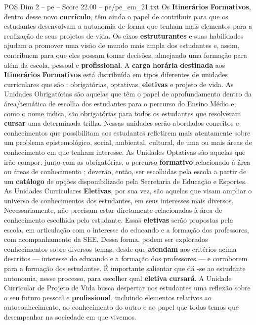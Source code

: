 \begin{textsample}{POS Dim 2 – pe – Score 22.00 – pe/pe\_em\_21.txt}
Os \textbf{Itinerários} \textbf{Formativos}, dentro desse novo \textbf{currículo}, têm ainda o papel de contribuir para que os estudantes desenvolvam a autonomia de forma que tenham mais elementos para a realização de seus projetos de vida.
Os eixos \textbf{estruturantes} e suas habilidades ajudam a promover uma visão de mundo mais ampla dos estudantes e, assim, contribuem para que eles possam tomar decisões, almejando uma formação para além da escola, pessoal e \textbf{profissional}.
A \textbf{carga} \textbf{horária} \textbf{destinada} aos \textbf{Itinerários} \textbf{Formativos} está distribuída em tipos diferentes de unidades curriculares que são : obrigatórias, optativas, \textbf{eletivas} e projeto de vida.
As Unidades Obrigatórias são aquelas que têm o papel de aprofundamento dentro da área/temática de escolha dos estudantes para o percurso do Ensino Médio e, como o nome indica, são obrigatórias para todos os estudantes que resolveram \textbf{cursar} uma determinada trilha.
Nessas unidades serão abordados conceitos e conhecimentos que possibilitam aos estudantes refletirem mais atentamente sobre um problema epistemológico, social, ambiental, cultural, de uma ou mais áreas de conhecimento em que tenham interesse.
As Unidades Optativas são aquelas que irão compor, junto com as obrigatórias, o percurso \textbf{formativo} relacionado à área ou áreas de conhecimento ; deverão, então, ser escolhidas pela escola a partir de um \textbf{catálogo} de opções disponibilizado pela Secretaria de Educação e Esportes.
As Unidades Curriculares \textbf{Eletivas}, por sua vez, são aquelas que visam ampliar o universo de conhecimentos dos estudantes, em seus interesses mais diversos.
Necessariamente, não precisam estar diretamente relacionadas à área de conhecimento escolhida pelo estudante.
Essas \textbf{eletivas} serão propostas pela escola, em articulação com o interesse do educando e a formação dos professores, com acompanhamento da SEE.
Dessa forma, podem ser explorados conhecimentos sobre diversos temas, desde que \textbf{atendam} aos critérios acima descritos — interesse do educando e a formação dos professores — e corroborem para a formação dos estudantes.
É importante salientar que dá -se ao estudante autonomia, nesse processo, para escolher qual \textbf{eletiva} \textbf{cursará}.
A Unidade Curricular de Projeto de Vida busca despertar nos estudantes uma reflexão sobre o seu futuro pessoal e \textbf{profissional}, incluindo elementos relativos ao autoconhecimento, ao conhecimento do outro e ao papel que todos temos que desempenhar na sociedade em que vivemos.

\end{textsample}
